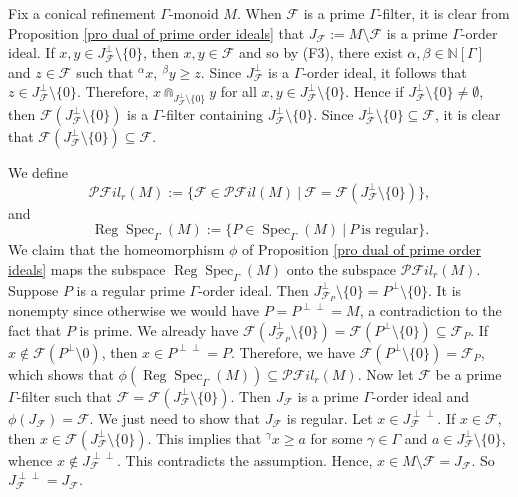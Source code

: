 \documentclass[a4paper,reqno,12pt]{amsart}
\numberwithin{equation}{section}
\theoremstyle{definition}
\theoremstyle{remark}
\newcommand{\Spec}{\operatorname{Spec}}
\newcommand{\reg}{\operatorname{Reg}}
\begin{document}
Fix a conical refinement $\Gamma$-monoid $M$. When $\mathcal{F}$ is a prime $\Gamma$-filter, it is clear from Proposition \ref{pro dual of prime order ideals} that $J_\mathcal{F}:=M\setminus \mathcal{F}$ is a prime $\Gamma$-order ideal. If $x,y\in J_\mathcal{F}^\perp\setminus \{0\}$, then $x,y\in \mathcal{F}$ and so by (F3), there exist $\alpha,\beta\in \mathbb{N}[\Gamma]$ and $z\in \mathcal{F}$ such that $^\alpha x,~^\beta y\ge z$. Since $J_{\mathcal{F}}^\perp$ is a $\Gamma$-order ideal, it follows that $z\in J_\mathcal{F}^\perp\setminus \{0\}$. Therefore, $x\Cap_{J_\mathcal{F}^\perp\setminus \{0\}} y$ for all $x,y\in J_\mathcal{F}^\perp\setminus \{0\}$. Hence if $J_\mathcal{F}^\perp\setminus \{0\}\neq \emptyset$, then $\mathcal{F}(J_\mathcal{F}^\perp\setminus \{0\})$ is a $\Gamma$-filter containing $J_\mathcal{F}^\perp\setminus \{0\}$. Since $J_\mathcal{F}^\perp\setminus \{0\}\subseteq \mathcal{F}$, it is clear that $\mathcal{F}(J_\mathcal{F}^\perp\setminus \{0\})\subseteq \mathcal{F}$. 

We define \[\mathscr{P}\mathscr{F}il_r(M):=\{\mathcal{F}\in \mathscr{P}\mathscr{F}il(M)~|~\mathcal{F}=\mathcal{F}(J_\mathcal{F}^\perp\setminus \{0\})\},\] and \[\reg\Spec_\Gamma(M):=\{P\in \Spec_\Gamma(M)~|~P~\text{is regular}\}.\] We claim that the homeomorphism $\phi$ of Proposition \ref{pro dual of prime order ideals} maps the subspace $\reg\Spec_\Gamma(M)$ onto the subspace $\mathscr{P}\mathscr{F}il_r(M)$. Suppose $P$ is a regular prime $\Gamma$-order ideal. Then $J_{\mathcal{F}_P}^\perp\setminus \{0\}=P^\perp\setminus \{0\}$. It is nonempty since otherwise we would have $P=P^{\perp\perp}=M$, a contradiction to the fact that $P$ is prime. We already have $\mathcal{F}(J_{\mathcal{F}_P}^\perp\setminus \{0\})=\mathcal{F}(P^\perp\setminus \{0\})\subseteq \mathcal{F}_P$. If $x\notin \mathcal{F}(P^\perp\setminus 0)$, then $x\in P^{\perp\perp}=P$. Therefore, we have $\mathcal{F}(P^\perp\setminus \{0\})=\mathcal{F}_P$, which shows that $\phi(\reg\Spec_\Gamma(M))\subseteq \mathscr{P}\mathscr{F}il_r(M)$. Now let $\mathcal{F}$ be a prime $\Gamma$-filter such that $\mathcal{F}=\mathcal{F}(J_\mathcal{F}^\perp\setminus \{0\})$. Then $J_\mathcal{F}$ is a prime $\Gamma$-order ideal and $\phi(J_\mathcal{F})=\mathcal{F}$. We just need to show that $J_\mathcal{F}$ is regular. Let $x\in J_\mathcal{F}^{\perp\perp}$. If $x\in \mathcal{F}$, then $x\in \mathcal{F}(J_\mathcal{F}^\perp\setminus \{0\})$. This implies that $^\gamma x\ge a$ for some $\gamma\in \Gamma$ and $a\in J_\mathcal{F}^\perp\setminus \{0\}$, whence $x\notin J_\mathcal{F}^{\perp\perp}$. This contradicts the assumption. Hence, $x\in M\setminus \mathcal{F}=J_\mathcal{F}$. So $J_\mathcal{F}^{\perp\perp}=J_\mathcal{F}$. 
\end{document}
